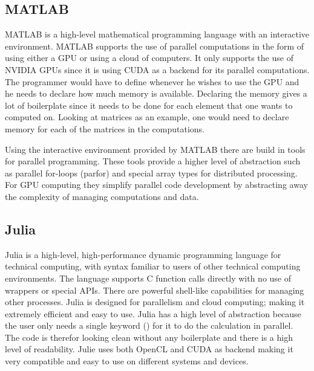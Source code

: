 \subsection{MATLAB}
MATLAB is a high-level mathematical programming language with an interactive environment.
MATLAB supports the use of parallel computations in the form of using either a GPU or using a cloud of computers.
It only supports the use of NVIDIA GPUs since it is using CUDA as a backend for its parallel computations.
The programmer would have to define whenever he wishes to use the GPU and he needs to declare how much memory is available.
Declaring the memory gives a lot of boilerplate since it needs to be done for each element that one wants to computed on.
Looking at matrices as an example, one would need to declare memory for each of the matrices in the computations.\citep{MATLAB_backend,MATLAB_benchmark,}

Using the interactive environment provided by MATLAB there are build in tools for parallel programming.
These tools provide a higher level of abstraction such as parallel for-loops (parfor) and special array types for distributed processing.
For GPU computing they simplify parallel code development by abstracting away the complexity of managing computations and data.\citep{MATLAB_parallel}

\subsection{Julia}
Julia is a high-level, high-performance dynamic programming language for technical computing, with syntax familiar to users of other technical computing environments.
The language supports C function calls directly with no use of wrappers or special APIs.
There are powerful shell-like capabilities for managing other processes.
Julia is designed for parallelism and cloud computing; making it extremely efficient and easy to use.
Julia has a high level of abstraction because the user only needs a single keyword (\@parallel) for it to do the calculation in parallel.
The code is therefor looking clean without any boilerplate and there is a high level of readability.
Julie uses both OpenCL and CUDA as backend making it very compatible and easy to use on different systems and devices.\citep{Julia_Git,Julia}

